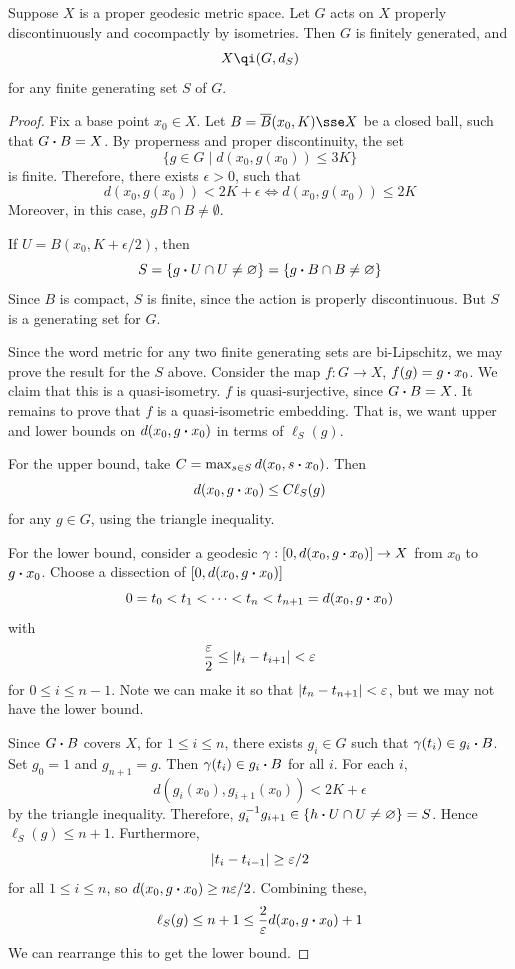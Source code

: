 \documentclass{article}
\begin{document}
\begin{theorem}

    Suppose \(X\) is a proper geodesic metric space. Let \(G\) acts on \(X\) properly discontinuously and cocompactly by isometries. Then \(G\) is finitely generated, and
    \[X \qi (G, d_S)\]
    for any finite generating set \(S\) of \(G\).
\end{theorem}

\begin{proof}
    Fix a base point \(x_0 \in X\). Let \(B = \overline{B}(x_0, K) \sse X\) be a closed ball, such that \(G \vdot B = X\). By properness and proper discontinuity, the set
    \[\{g \in G \mid d(x_0, g(x_0)) \le 3K\}\]
    is finite. Therefore, there exists \(\epsilon > 0\), such that 
    \[d(x_0, g(x_0)) < 2K + \epsilon \iff d(x_0, g(x_0)) \le 2K\]
    Moreover, in this case, \(g B \cap B \ne \emptyset\).

    \lec

    If \(U = B(x_0, K + \epsilon/2)\), then
    \[S  = \{g \vdot U \cap U \ne \emptyset\} = \{g \vdot B \cap B \ne \emptyset\}\]
    Since \(B\) is compact, \(S\) is finite, since the action is properly discontinuous. But \(S\) is a generating set for \(G\).

    Since the word metric for any two finite generating sets are bi-Lipschitz, we may prove the result for the \(S\) above. Consider the map \(f : G \to X\), \(f(g) = g \vdot x_0\). We claim that this is a quasi-isometry. \(f\) is quasi-surjective, since \(G\vdot B = X\). It remains to prove that \(f\) is a quasi-isometric embedding. That is, we want upper and lower bounds on \(d(x_0, g\vdot x_0)\) in terms of \(\ell_S(g)\).

    For the upper bound, take \(C = \max_{s \in S}d(x_0, s\vdot x_0)\). Then
    \[d(x_0, g\vdot x_0) \le C\ell_S(g)\]
    for any \(g \in G\), using the triangle inequality.

    For the lower bound, consider a geodesic \(\gamma : [0, d(x_0, g\vdot x_0)] \to X\) from \(x_0\) to \(g\vdot x_0\). Choose a dissection of \([0, d(x_0, g\vdot x_0)]\)
    \[0 = t_0 < t_1 < \cdots < t_n < t_{n+1} = d(x_0, g\vdot x_0)\]
    with
    \[\frac{\varepsilon}{2} \le \abs{t_i - t_{i+1}} < \varepsilon\]
    for \(0 \le i \le n-1\). Note we can make it so that \(\abs{t_n - t_{n+1}} < \varepsilon\), but we may not have the lower bound.

    Since \(G \vdot B\) covers \(X\), for \(1 \le i \le n\), there exists \(g_i \in G\) such that \(\gamma(t_i) \in g_i \vdot B\). Set \(g_0 = 1\) and \(g_{n+1} = g\). Then \(\gamma(t_i) \in g_i\vdot B\) for all \(i\). For each \(i\),
    \[d(g_i(x_0), g_{i+1}(x_0)) < 2K + \epsilon\]
    by the triangle inequality. Therefore, \(g_i^{-1}g_{i+1} \in \{h \vdot U \cap U \ne \emptyset\} = S\). Hence \(\ell_S(g) \le n+1\). Furthermore,
    \[\abs{t_i - t_{i-1}} \ge \varepsilon/2\]
    for all \(1 \le i \le n\), so \(d(x_0, g \vdot x_0) \ge n\epsilon/2\). Combining these,
    \[\ell_S(g) \le n + 1 \le \frac{2}{\epsilon}d(x_0, g\vdot x_0) + 1\]
    We can rearrange this to get the lower bound.
\end{proof}
\end{document}
